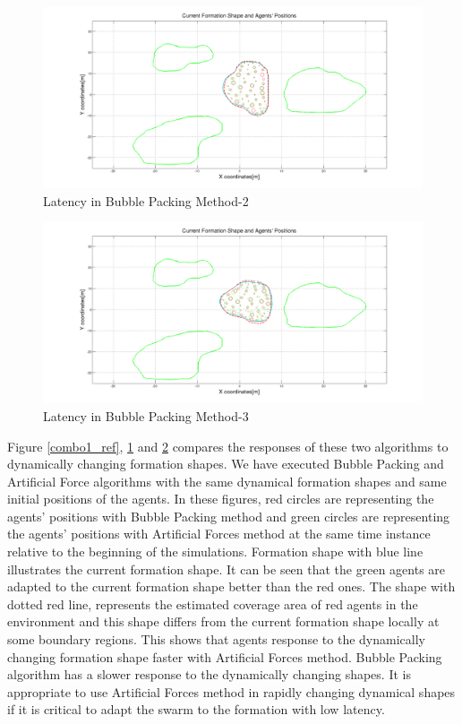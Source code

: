 \begin{figure}[H]
\caption{Latency in Bubble Packing Method-2} \label{combo2_ref}
\centerline{\includegraphics[scale = 0.30]{combo2}}
\end{figure} 

\begin{figure}[H]
\caption{Latency in Bubble Packing Method-3} \label{combo3_ref}
\centerline{\includegraphics[scale = 0.30]{combo3}}
\end{figure} 

Figure \ref{combo1_ref}, \ref{combo2_ref} and \ref{combo3_ref} compares the responses of these two algorithms to dynamically changing formation shapes. We have executed Bubble Packing and Artificial Force algorithms with the same dynamical formation shapes and same initial positions of the agents. In these figures, red circles are representing the agents' positions with Bubble Packing method and green circles are representing the agents' positions with Artificial Forces method at the same time instance relative to the beginning of the simulations. Formation shape with blue line illustrates the current formation shape. It can be seen that the green agents are adapted to the current formation shape better than the red ones. The shape with dotted red line, represents the estimated coverage area of red agents in the environment and this shape differs from the current formation shape locally at some boundary regions. This shows that agents response to the dynamically changing formation shape faster with Artificial Forces method. Bubble Packing algorithm has a slower response to the dynamically changing shapes. It is appropriate to use Artificial Forces method in rapidly changing dynamical shapes if it is critical to adapt the swarm to the formation with low latency.

